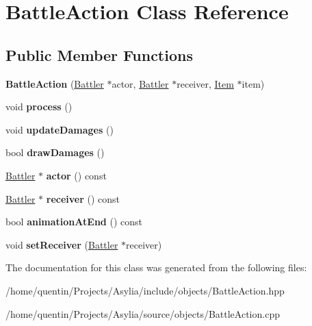 \hypertarget{classBattleAction}{\section{Battle\-Action Class Reference}
\label{classBattleAction}
}
\subsection*{Public Member Functions}
\begin{DoxyCompactItemize}
\item 
\hypertarget{classBattleAction_a9b6b05f746e2d9f04b5498f36df9488a}{{\bfseries Battle\-Action} (\hyperlink{classBattler}{Battler} $\ast$actor, \hyperlink{classBattler}{Battler} $\ast$receiver, \hyperlink{classItem}{Item} $\ast$item)}\label{classBattleAction_a9b6b05f746e2d9f04b5498f36df9488a}

\item 
\hypertarget{classBattleAction_ab56443cf3e4d5562ee46efcb65e470d5}{void {\bfseries process} ()}\label{classBattleAction_ab56443cf3e4d5562ee46efcb65e470d5}

\item 
\hypertarget{classBattleAction_ae465e2ef0dd218368d5e006bda4ee978}{void {\bfseries update\-Damages} ()}\label{classBattleAction_ae465e2ef0dd218368d5e006bda4ee978}

\item 
\hypertarget{classBattleAction_af684977431c24f66fe878fc7d068d5cd}{bool {\bfseries draw\-Damages} ()}\label{classBattleAction_af684977431c24f66fe878fc7d068d5cd}

\item 
\hypertarget{classBattleAction_a8c7336976d1554616fe1bf6d649abae4}{\hyperlink{classBattler}{Battler} $\ast$ {\bfseries actor} () const }\label{classBattleAction_a8c7336976d1554616fe1bf6d649abae4}

\item 
\hypertarget{classBattleAction_aac14c90c15d4c88d2cbd5bb201b22ad8}{\hyperlink{classBattler}{Battler} $\ast$ {\bfseries receiver} () const }\label{classBattleAction_aac14c90c15d4c88d2cbd5bb201b22ad8}

\item 
\hypertarget{classBattleAction_a5030a7484d3a6d00376d9ade6e2835f5}{bool {\bfseries animation\-At\-End} () const }\label{classBattleAction_a5030a7484d3a6d00376d9ade6e2835f5}

\item 
\hypertarget{classBattleAction_aa4ad0fe6855848076449398200b188f0}{void {\bfseries set\-Receiver} (\hyperlink{classBattler}{Battler} $\ast$receiver)}\label{classBattleAction_aa4ad0fe6855848076449398200b188f0}

\end{DoxyCompactItemize}


The documentation for this class was generated from the following files\-:\begin{DoxyCompactItemize}
\item 
/home/quentin/\-Projects/\-Asylia/include/objects/Battle\-Action.\-hpp\item 
/home/quentin/\-Projects/\-Asylia/source/objects/Battle\-Action.\-cpp\end{DoxyCompactItemize}

